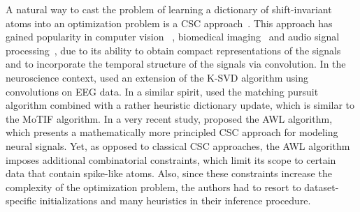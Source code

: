 
A natural way to cast the problem of learning a dictionary of shift-invariant atoms into an optimization problem is a \ac{CSC} approach~\citep{Grosse-etal:2007}. 
This approach has gained popularity in computer vision~\citep{heide2015fast,wohlberg2016efficient,zeiler2010deconvolutional, vsorel2016fast,kavukcuoglu2010learning}%
, biomedical imaging~\citep{pachitariu2013extracting} and audio signal processing~\citep{Grosse-etal:2007,mailhe2008shift},
due to its ability to obtain compact representations of the signals and to incorporate the temporal structure of the signals via convolution.
In the neuroscience context, \citet{barthelemy2013multivariate} used an extension of the K-SVD algorithm using convolutions on EEG data. 
In a similar spirit, \citet{brockmeier2016learning} used the matching pursuit algorithm combined with a rather heuristic  
dictionary update, which is similar to the MoTIF algorithm. 
%
In a very recent study, \citet{hitziger2017adaptive} proposed the AWL algorithm, which presents a mathematically more principled \ac{CSC} approach for modeling neural signals. Yet, as opposed to classical \ac{CSC} approaches, the AWL algorithm imposes additional combinatorial  constraints, which limit its scope to certain data that contain spike-like atoms. Also, since these constraints increase the complexity of the optimization problem, the authors had to resort to dataset-specific initializations and many heuristics in their inference procedure.

